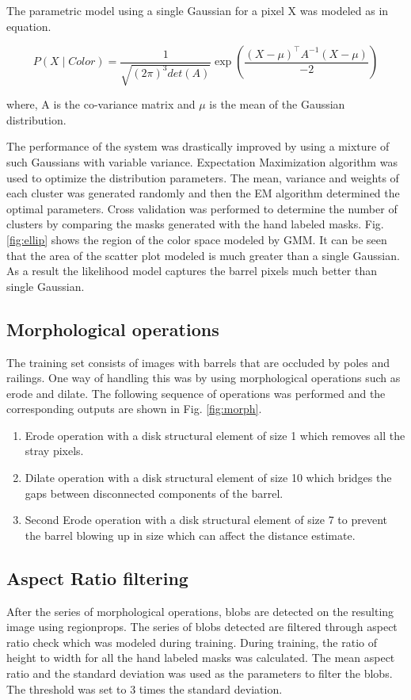\documentclass[fleqn,10pt]{SelfArx} %
\begin{document}
The parametric model using a single Gaussian for a pixel X was modeled as in equation.

\[
P(X\mid Color) = \frac{1}{\sqrt{(2\pi)^3det(A)}}\exp \left(\frac{(X - \mu)^\top A^{-1} (X - \mu)}{-2} \right)
\]

where, A is the co-variance matrix and $\mu$ is the mean of the Gaussian distribution.


The performance of the system was drastically improved by using a mixture of such Gaussians with variable variance. Expectation Maximization algorithm was used to optimize the distribution parameters. The mean, variance and weights of each cluster was generated randomly and then the EM algorithm determined the optimal parameters. Cross validation was performed to determine the number of clusters by comparing the masks generated with the hand labeled masks. Fig. \ref{fig:ellip} shows the region of the color space modeled by GMM. It can be seen that the area of the scatter plot modeled is much greater than a single Gaussian. As a result the likelihood model captures the barrel pixels much better than single Gaussian.

\subsection{Morphological operations}

The training set consists of images with barrels that are occluded by poles and railings. One way of handling this was by using morphological operations such as erode and dilate. The following sequence of operations was performed and the corresponding outputs are shown in Fig. \ref{fig:morph}.
\begin{enumerate}
\item Erode operation with a disk structural element of size 1 which removes all the stray pixels.
\item Dilate operation with a disk structural element of size 10 which bridges the gaps between disconnected components of the barrel.
\item Second Erode operation with a disk structural element of size 7 to prevent the barrel blowing up in size which can affect the distance estimate.
\end{enumerate}

\subsection{Aspect Ratio filtering}
After the series of morphological operations, blobs are detected on the resulting image using regionprops. The series of blobs detected are filtered through aspect ratio check which was modeled during training. During training, the ratio of height to width for all the hand labeled masks was calculated. The mean aspect ratio and the standard deviation was used as the parameters to filter the blobs. The threshold was set to 3 times the standard deviation. 
\end{document}
